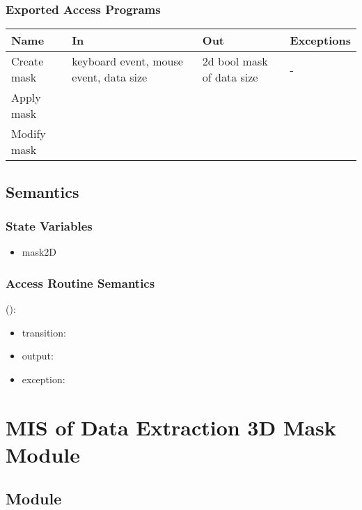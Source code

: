 \documentclass[12pt, titlepage]{article}
\begin{document}
\subsubsection{Exported Access Programs}

\begin{center}
\begin{tabular}{p{2cm} p{4cm} p{4cm} p{2cm}}
\hline
\textbf{Name} & \textbf{In} & \textbf{Out} & \textbf{Exceptions} \\
\hline
Create mask & keyboard event, mouse event, data size & 2d bool mask of data size & - \\
Apply mask & & & \\
Modify mask & & & \\

\hline
\end{tabular}
\end{center}

\subsection{Semantics}

\subsubsection{State Variables}
\begin{itemize}
\item mask2D
\end{itemize}

\subsubsection{Access Routine Semantics}

\noindent {}():
\begin{itemize}
\item transition:  
\item output:  
\item exception:  
\end{itemize}

\section{MIS of Data Extraction 3D Mask Module} \label{Mod:Mask3D}

\subsection{Module}
\end{document}
